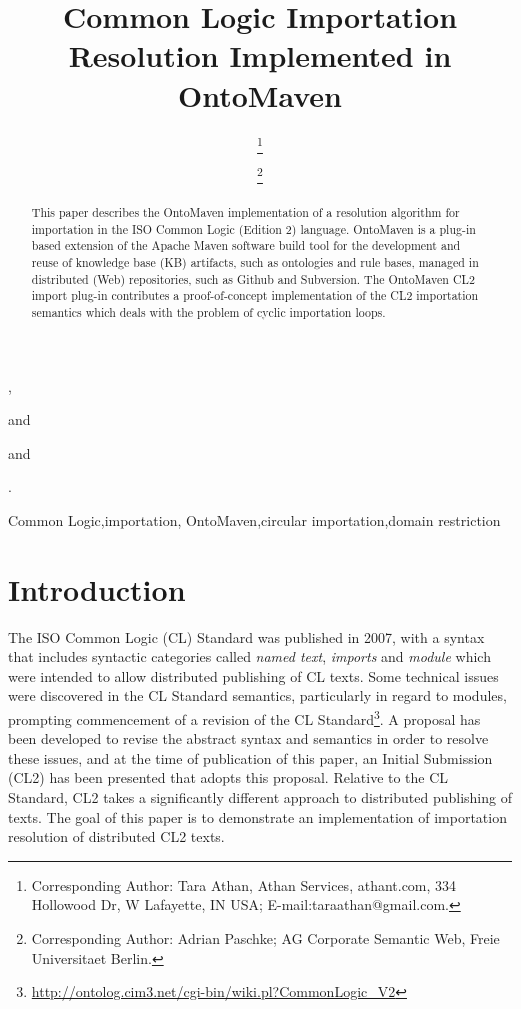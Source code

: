 \documentclass{IOS-Book-Article}
\begin{document}
\newtheorem{theo}{Theorem}
\newtheorem{cor}{Corollary}
\newtheorem{lem}{Lemma}
\begin{frontmatter}              %

\title{Common Logic Importation Resolution Implemented in OntoMaven}

\author[A]{ },%
\author[B]{ 
\thanks{Corresponding Author: Tara Athan, Athan Services, athant.com, 334 Hollowood Dr, W Lafayette, IN USA; E-mail:taraathan@gmail.com.}}
and
\author[A]{ 
\thanks{Corresponding Author: Adrian Paschke; AG Corporate Semantic Web, Freie Universitaet Berlin.}}
\address[A]{Freie Universitaet Berlin, Germany} and
\address[B]{Athan Services, USA}.

\begin{abstract}
This paper describes the OntoMaven implementation of a resolution algorithm for importation in the ISO Common Logic (Edition 2) language. OntoMaven is a plug-in based extension of the Apache Maven software build tool for the development and reuse of knowledge base (KB) artifacts, such as ontologies and rule bases, managed in distributed (Web) repositories, such as Github and Subversion. The OntoMaven CL2 import plug-in contributes a proof-of-concept implementation of the CL2 importation semantics which deals with the problem of cyclic importation loops.
\end{abstract}

\begin{keyword}
Common Logic\sep importation\sep
OntoMaven\sep circular importation\sep domain restriction
\end{keyword}
\end{frontmatter}

\thispagestyle{empty}
\pagestyle{empty}

\section*{Introduction}
\label{intro}
The ISO Common Logic (CL) Standard\cite{CL2007} was published in 2007, with a syntax that includes syntactic categories called \emph{named text}, \emph{imports} and \emph{module} which were intended to allow distributed publishing of CL texts.
Some technical issues were discovered\cite{horatio2012} in the CL Standard semantics, particularly in regard to modules, 
prompting commencement of a revision of the CL Standard\footnote{\url{http://ontolog.cim3.net/cgi-bin/wiki.pl?CommonLogic_V2}}.
A proposal has been developed\cite{AthanNeuhaus} to revise the abstract syntax and semantics in order to 
resolve these issues, and at the time of publication of this paper, 
an Initial Submission\cite{CDv2} (CL2) has been presented that adopts this proposal. 
Relative to the CL Standard, CL2 takes a significantly different approach to distributed publishing of texts.
The goal of this paper is to demonstrate an implementation of importation resolution of distributed CL2 texts.
\end{document}
